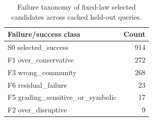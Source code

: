 \begin{table}[t]
\centering
\begin{tabular}{lr}
\toprule
Failure/success class & Count \\
\midrule
S0 selected\_success & 914 \\
F1 over\_conservative & 272 \\
F3 wrong\_community & 268 \\
F6 residual\_failure & 23 \\
F5 grading\_sensitive\_or\_symbolic & 17 \\
F2 over\_disruptive & 9 \\
\bottomrule
\end{tabular}
\caption{Failure taxonomy of fixed-law selected candidates across cached held-out queries.}
\label{tab:ngc\_failure\_taxonomy}
\end{table}
